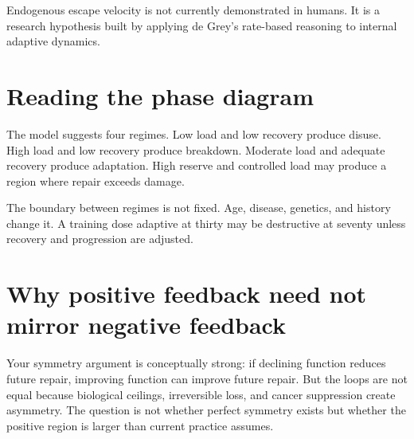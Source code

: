 Endogenous escape velocity is not currently demonstrated in humans. It is a research hypothesis built by applying de Grey's rate-based reasoning to internal adaptive dynamics.

\section{Reading the phase diagram}\label{reading-the-phase-diagram}

The model suggests four regimes. Low load and low recovery produce disuse. High load and low recovery produce breakdown. Moderate load and adequate recovery produce adaptation. High reserve and controlled load may produce a region where repair exceeds damage.

The boundary between regimes is not fixed. Age, disease, genetics, and history change it. A training dose adaptive at thirty may be destructive at seventy unless recovery and progression are adjusted.

\section{Why positive feedback need not mirror negative feedback}\label{why-positive-feedback-need-not-mirror-negative-feedback}

Your symmetry argument is conceptually strong: if declining function reduces future repair, improving function can improve future repair. But the loops are not equal because biological ceilings, irreversible loss, and cancer suppression create asymmetry. The question is not whether perfect symmetry exists but whether the positive region is larger than current practice assumes.
